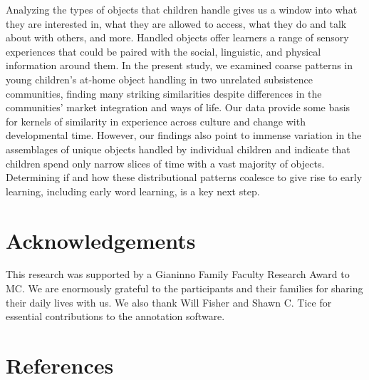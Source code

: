 \documentclass[10pt, letterpaper]{article}
\begin{document}
Analyzing the types of objects that children handle gives us a window
into what they are interested in, what they are allowed to access, what
they do and talk about with others, and more. Handled objects offer
learners a range of sensory experiences that could be paired with the
social, linguistic, and physical information around them. In the present
study, we examined coarse patterns in young children's at-home object
handling in two unrelated subsistence communities, finding many striking
similarities despite differences in the communities' market integration
and ways of life. Our data provide some basis for kernels of similarity
in experience across culture and change with developmental time.
However, our findings also point to immense variation in the assemblages
of unique objects handled by individual children and indicate that
children spend only narrow slices of time with a vast majority of
objects. Determining if and how these distributional patterns coalesce
to give rise to early learning, including early word learning, is a key
next step.

\vspace{1em}

\hypertarget{acknowledgements}{%
\section{Acknowledgements}\label{acknowledgements}}

This research was supported by a Gianinno Family Faculty Research Award
to MC. We are enormously grateful to the participants and their families
for sharing their daily lives with us. We also thank Will Fisher and
Shawn C. Tice for essential contributions to the annotation software.

\hypertarget{references}{%
\section{References}\label{references}}

\setlength{\parindent}{-0.1in} 
\setlength{\leftskip}{0.125in}

\noindent
\end{document}
